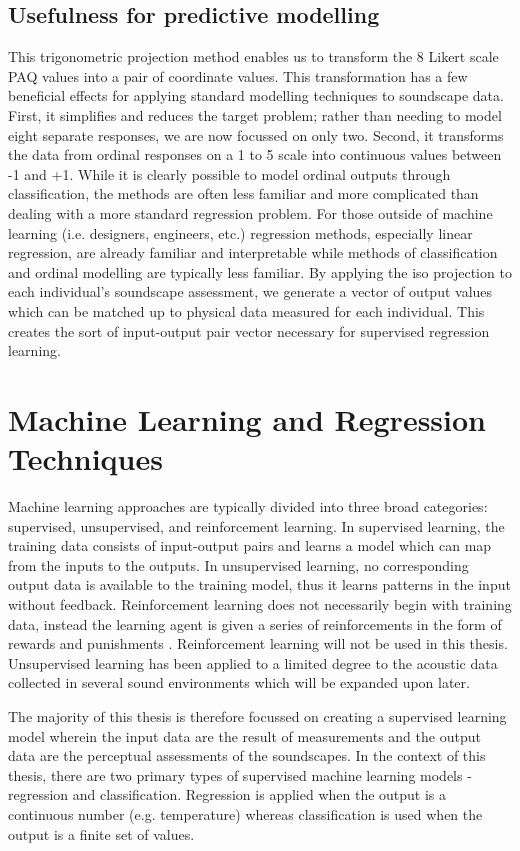 \subsection{Usefulness for predictive modelling}
This trigonometric projection method enables us to transform the 8 Likert scale PAQ values into a pair of coordinate values. This transformation has a few beneficial effects for applying standard modelling techniques to soundscape data. First, it simplifies and reduces the target problem; rather than needing to model eight separate responses, we are now focussed on only two. Second, it transforms the data from ordinal responses on a 1 to 5 scale into continuous values between -1 and +1. While it is clearly possible to model ordinal outputs through classification, the methods are often less familiar and more complicated than dealing with a more standard regression problem. For those outside of machine learning (i.e. designers, engineers, etc.) regression methods, especially linear regression, are already familiar and interpretable while methods of classification and ordinal modelling are typically less familiar. By applying the \gls{iso} projection to each individual's soundscape assessment, we generate a vector of output values which can be matched up to physical data measured for each individual. This creates the sort of input-output pair vector necessary for supervised regression learning.

\section{Machine Learning and Regression Techniques}
Machine learning approaches are typically divided into three broad categories: supervised, unsupervised, and reinforcement learning. In supervised learning, the training data consists of input-output pairs and learns a model which can map from the inputs to the outputs. In unsupervised learning, no corresponding output data is available to the training model, thus it learns patterns in the input without feedback. Reinforcement learning does not necessarily begin with training data, instead the learning agent is given a series of reinforcements in the form of rewards and punishments \citep{StuartRussell2021}. Reinforcement learning will not be used in this thesis. Unsupervised learning has been applied to a limited degree to the acoustic data collected in several sound environments which will be expanded upon later. 

The majority of this thesis is therefore focussed on creating a supervised learning model wherein the input data are the result of measurements and the output data are the perceptual assessments of the soundscapes. In the context of this thesis, there are two primary types of supervised machine learning models - regression and classification. Regression is applied when the output is a continuous number (e.g. temperature) whereas classification is used when the output is a finite set of values. 



